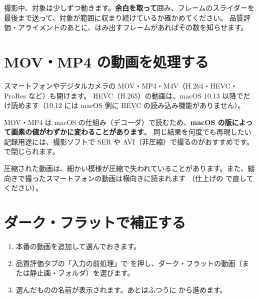 \begin{caution}[対象が範囲からはみ出さないように]
  撮影中、対象は少しずつ動きます。\textbf{余白を取って}囲み、フレームのスライダーを最後まで送って、対象が範囲に収まり続けているか確かめてください。
  品質評価・アライメントのあとに、はみ出すフレームがあればその数を知らせます。
\end{caution}

\section{MOV・MP4 の動画を処理する}\label{sec:movie}

スマートフォンやデジタルカメラの MOV・MP4・M4V（H.264・HEVC・ProRes など）も開けます。
HEVC（H.265）の動画は、macOS 10.13 以降でだけ読めます（10.12 には macOS 側に HEVC の読み込み機能がありません）。


\begin{marklist}
  \item MOV・MP4 は macOS の仕組み（デコーダ）で読むため、\textbf{macOS の版によって画素の値がわずかに変わることがあります}。
        同じ結果を何度でも再現したい記録用途には、撮影ソフトで SER や AVI（非圧縮）で撮るのがおすすめです。 で閉じられます。
\end{marklist}

\begin{caution}
  圧縮された動画は、細かい模様が圧縮で失われていることがあります。また、縦向きで撮ったスマートフォンの動画は横向きに読まれます
  （仕上げの  で直してください）。
\end{caution}

\section{ダーク・フラットで補正する}\label{sec:calibration}

\begin{enumerate}[itemsep=2pt]
  \item 本番の動画を追加して選んでおきます。
  \item 品質評価タブの「入力の前処理」で  を押し、ダーク・フラットの動画（または静止画・フォルダ）を選びます。
  \item 選んだものの名前が表示されます。あとはふつうに  から進めます。
\end{enumerate}

